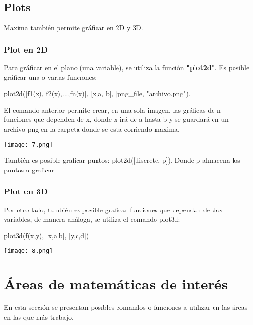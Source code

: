\documentclass[12pt]{article}
\begin{document}
\subsection{Plots}

Maxima también permite gráficar en 2D y 3D. 

\subsubsection{Plot en 2D}

Para gráficar en el plano (una variable), se utiliza la función \textbf{"plot2d"}. Es posible gráficar una o varias funciones:

\begin{center}
plot2d([f1(x), f2(x),...,fn(x)], [x,a, b], [png\_file, "archivo.png"). 
\end{center}

El comando anterior permite crear, en una sola imagen, las gráficas de n funciones que dependen de x, donde x irá de a hasta b y se guardará en un archivo png en la carpeta donde se esta corriendo maxima. \\

\begin{center}
 \texttt{[image: 7.png]}
 \end{center}

También es posible graficar puntos: plot2d([discrete, p]). Donde p almacena los puntos a graficar.

\subsubsection{Plot en 3D}

Por otro lado, también es posible graficar funciones que dependan de dos variables, de manera análoga, se utiliza el comando plot3d: 

\begin{center}
plot3d(f(x,y), [x,a,b], [y,c,d])
\end{center} 

\begin{center}
 \texttt{[image: 8.png]}
 \end{center}

\clearpage
\section{Áreas de matemáticas de interés}

En esta sección se presentan posibles comandos o funciones a utilizar en las áreas en las que más trabajo. 
\end{document}
